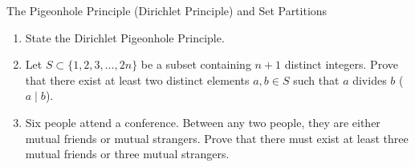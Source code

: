 \begin{exercise}{The Pigeonhole Principle (Dirichlet Principle) and Set Partitions}
\begin{enumerate}[leftmargin=1.5em,itemsep=2pt]
  \item State the Dirichlet Pigeonhole Principle.
  \item Let $S \subset \{1, 2, 3, \dots, 2n\}$ be a subset containing $n + 1$ distinct integers.
  Prove that there exist at least two distinct elements $a, b \in S$ such that $a$ divides $b$ ($a \mid b$).
  \item Six people attend a conference. Between any two people, they are either mutual friends or mutual strangers. Prove that there must exist at least three mutual friends or three mutual strangers.
\end{enumerate}
\end{exercise}

\begin{tabletworkspace}[5.5cm]
\end{tabletworkspace}

